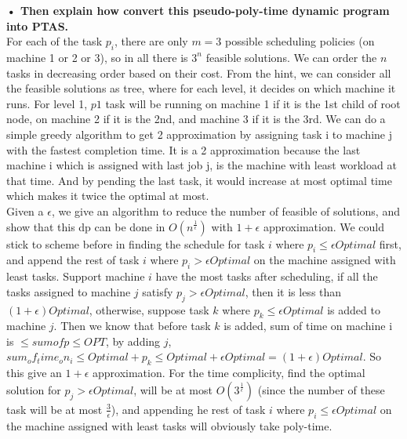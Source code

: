 \documentclass{article}
\begin{document}
\textbf{• Then explain how convert this pseudo-poly-time dynamic program into PTAS.}  \\ \newline
For each of the task $p_i$, there are only $m = 3$ possible scheduling policies (on machine 1 or 2 or 3), so in all there is $3^n$ feasible solutions. We can order the $n$ tasks in decreasing order based on their cost. From the hint, we can consider all the feasible solutions as tree, where for each level, it decides on which machine it runs. For level 1, $p1$ task will be running on machine 1 if it is the 1st child of root node, on machine 2 if it is the 2nd, and machine 3 if it is the 3rd. We can do a simple greedy algorithm to get 2 approximation by assigning task i to machine j with the fastest completion time. It is a 2 approximation because the last machine i which is assigned with last job j, is the machine with least workload at that time. And by pending the last task, it would increase at most optimal time which makes it twice the optimal at most.
\\ \newline
Given a $\epsilon$, we give an algorithm to reduce the number of feasible of solutions, and show that this dp can be done in $O(n^{\frac{1}{\epsilon}})$ with $1+\epsilon$ approximation. We could stick to scheme before in finding the schedule for task $i$ where $p_i \leq \epsilon Optimal$ first, and append the rest of task $i$ where $p_i > \epsilon Optimal$ on the machine assigned with least tasks. Support machine $i$ have the most tasks after scheduling, if all the tasks assigned to machine $j$ satisfy $p_j > \epsilon Optimal$, then it is less than $(1+\epsilon)Optimal$, otherwise, suppose task $k$ where $p_k \leq \epsilon Optimal$ is added to machine $j$. Then we know that before task $k$ is added, sum of time on machine i is $\leq sum of p \leq OPT$, by adding $j$, $sum_of_time_on_i \leq Optimal + p_k  \leq Optimal + \epsilon Optimal = (1+\epsilon)Optimal$. So this give an $1+\epsilon$ approximation. For the time complicity, find the optimal solution for $p_j > \epsilon Optimal$, will be at most $O(3^\frac{1}{\epsilon})$ (since the number of these task will be at most $\frac{3}{\epsilon}$), and appending  he rest of task $i$ where $p_i \leq \epsilon Optimal$ on the machine assigned with least tasks will obviously take poly-time.
\end{document}
